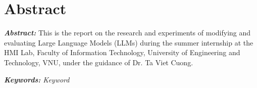 \chapter*{Abstract}

\textit{\textbf{Abstract:}} This is the report on the research and experiments of modifying and evaluating Large Language Models (LLMs) during the summer internship at the HMI Lab, Faculty of Information Technology, University of Engineering and Technology, VNU, under the guidance of Dr. Ta Viet Cuong.
\begin{flushleft}
  \textit{\textbf{Keywords:} Keyword}
\end{flushleft}
\changefontsizes[16pt]{13pt}